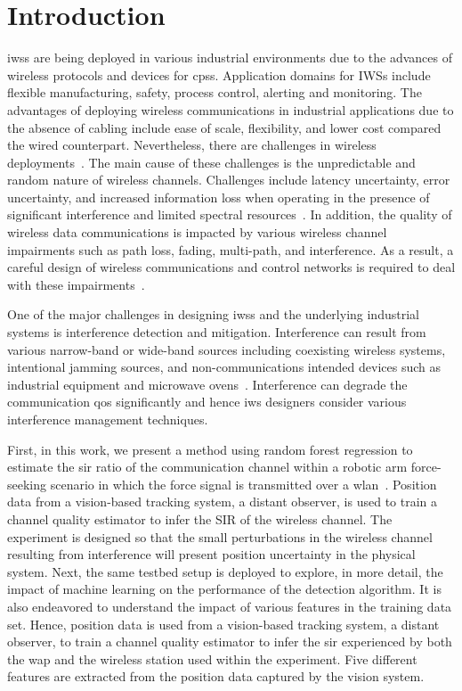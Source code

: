 	\section{Introduction} \label{ftml:sec:intro}    
	\Glspl{iws} are being deployed in various industrial environments due to the advances of wireless protocols and devices for \glspl{cps}. Application domains for IWSs include flexible manufacturing, safety, process control, alerting and monitoring\cite{Candell2018.IWSGuide}. The advantages of deploying wireless communications in industrial applications due to the absence of cabling include ease of scale, flexibility, and lower cost compared the wired counterpart. Nevertheless, there are challenges in wireless deployments~\cite{Sisinni2018,Bello2017,Pang2017.WirelessChallenges}. The main cause of these challenges is the unpredictable and random nature of wireless channels. Challenges include latency uncertainty, error uncertainty, and  increased information loss when operating in the presence of significant interference and limited spectral resources~\cite{Candell2017.SAS.IWSWorkshopReport}. In addition, the quality of wireless data communications is impacted by various wireless channel impairments such as path loss, fading, multi-path, and interference. As a result, a careful design of wireless communications and control networks is required to deal with these impairments~\cite{Lu2016.WirelessCPS,Kim2017.WirelessCodesign}.    
    
    One of the major challenges in designing \glspl{iws} and the underlying industrial systems is interference detection and mitigation. Interference can result from various narrow-band or wide-band sources including  coexisting wireless systems, intentional jamming sources, and non-communications intended devices such as industrial equipment and microwave ovens~\cite{Chiwewe2015.Survey.CR.Intf}. Interference can degrade the communication \gls{qos} significantly and hence \gls{iws} designers consider various interference management techniques. 
    
    First, in this work, we present a method using random forest regression to estimate the \gls{sir} ratio of the communication channel within a robotic arm force-seeking scenario in which the force signal is transmitted over a \gls{wlan}~\cite{IEEE802.11ac}.  Position data from a vision-based tracking system, a distant observer, is used to train a channel quality estimator to infer the SIR of the wireless channel. The experiment is designed so that the small perturbations in the wireless channel resulting from interference will present position uncertainty in the physical system.  Next, the same testbed setup is deployed to explore, in more detail, the impact of machine learning on the performance of the detection algorithm.  It is also endeavored to understand the impact of various features in the training data set. Hence, position data is used from a vision-based tracking system, a distant observer, to train a channel quality estimator to infer the \gls{sir} experienced by both the \gls{wap} and the wireless station used within the experiment. Five different features are extracted from the position data captured by the vision system. 
    

